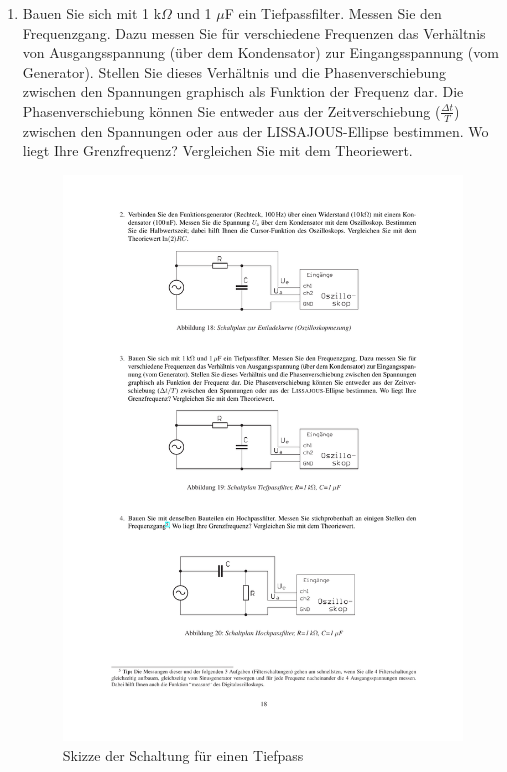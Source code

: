 \documentclass[12pt]{scrartcl}
\begin{document}
\begin{enumerate}
\item
Bauen Sie sich mit 1 k$\Omega$ und 1
$\mu$F ein Tiefpassfilter. Messen Sie den Frequenzgang. Dazu messen Sie für
verschiedene Frequenzen das Verhältnis von Ausgangsspannung (über dem Kondensator) zur Eingangsspannung (vom Generator). Stellen Sie dieses Verhältnis und die Phasenverschiebung zwischen den Spannungen graphisch als Funktion der Frequenz dar. Die Phasenverschiebung können Sie entweder aus der Zeitverschiebung ($\frac{\Delta t}{T}$) zwischen den Spannungen oder aus der LISSAJOUS-Ellipse bestimmen. Wo liegt Ihre Grenzfrequenz? Vergleichen Sie mit dem Theoriewert.
\begin{figure}[htbp] 
  \centering
    \includegraphics[trim = 1mm 225mm 1mm 37mm, clip, scale = 1]{tiefpass.pdf}
  	\caption[Skizze der Schaltung für einen Tiefpass]{Skizze der Schaltung für einen Tiefpass\footnotemark}

\end{figure}
\end{enumerate}
\end{document}
